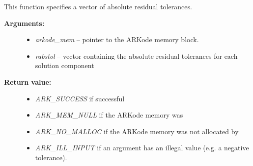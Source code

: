 \documentclass[letterpaper,10pt,english]{sphinxmanual}
\begin{document}
\begin{fulllineitems}
\label{c_interface/User_callable:c.ARKodeResVtolerance}
This function specifies a vector of absolute residual tolerances.
\begin{description}
\item[{\textbf{Arguments:}}] \leavevmode\begin{itemize}
\item {} 
\emph{arkode\_mem} -- pointer to the ARKode memory block.

\item {} 
\emph{rabstol} -- vector containing the absolute residual
tolerances for each solution component

\end{itemize}

\item[{\textbf{Return value:}}] \leavevmode\begin{itemize}
\item {} 
\emph{ARK\_SUCCESS} if successful

\item {} 
\emph{ARK\_MEM\_NULL}  if the ARKode memory was 

\item {} 
\emph{ARK\_NO\_MALLOC}  if the ARKode memory was not allocated by {\hyperref[c_interface/User_callable:c.ARKodeInit]{\emph{}}}

\item {} 
\emph{ARK\_ILL\_INPUT} if an argument has an illegal value (e.g. a negative tolerance).

\end{itemize}

\end{description}

\end{fulllineitems}

\end{document}
